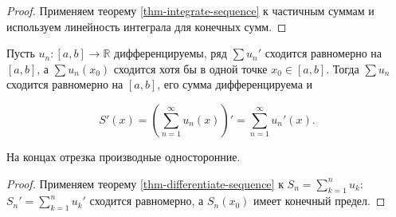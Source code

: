 \begin{proof}

Применяем теорему \ref{thm-integrate-sequence} к частичным суммам и используем линейность интеграла для конечных сумм.

\end{proof}

\begin{theorem}\label{thm-series-derivative}

Пусть \(u_n:[a,b]\to\mathbb R\) дифференцируемы, ряд \(\sum u_n'\) сходится равномерно на \([a,b]\), а \(\sum u_n(x_0)\) сходится хотя бы в одной точке \(x_0\in[a,b]\). Тогда \(\sum u_n\) сходится равномерно на \([a,b]\), его сумма дифференцируема и

\begin{equation}
S'(x)=\left(\sum_{n=1}^\infty u_n(x)\right)'
=\sum_{n=1}^\infty u_n'(x).
\label{eq-series-derivative}
\end{equation}

На концах отрезка производные односторонние.

\end{theorem}

\begin{proof}

Применяем теорему \ref{thm-differentiate-sequence} к \(S_n=\sum_{k=1}^n u_k\): \(S_n'=\sum_{k=1}^n u_k'\) сходится равномерно, а \(S_n(x_0)\) имеет конечный предел.

\end{proof}
